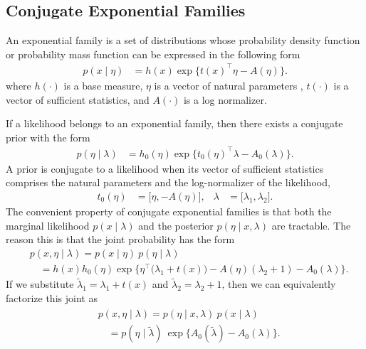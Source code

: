 \documentclass{article}
\begin{document}
\subsection{Conjugate Exponential Families}
An exponential family is a set of distributions whose probability density function or probability mass function can be expressed in the following form
\begin{align}
\label{eq:cebm-likelihood}
    p(x \mid \eta) 
    &= 
    h(x) \exp \big\{ 
        t(x)^\top \eta   
        - A(\eta) \big\}.
\end{align}
where $h(\cdot)$ is a base measure, $\eta$ is a vector of natural parameters , $t(\cdot)$ is a vector of sufficient statistics, and $A(\cdot)$ is a log normalizer.

If a likelihood belongs to an exponential family, then there exists a conjugate prior with the form
\begin{align*}
    p(\eta \mid \lambda) 
    &= 
    h_0(\eta) \exp \big\{ 
    t_0(\eta)^\top \lambda
    - A_0(\lambda) \big\}.
\end{align*}   
A prior is conjugate to a likelihood when its vector of sufficient statistics comprises the natural parameters and the log-normalizer of the likelihood,
\begin{align*}
    t_0(\eta) &= \big[ \eta, - A(\eta) \big], 
    &
    \lambda &= \big[ \lambda_1, \lambda_2 \big].
\end{align*}
The convenient property of conjugate exponential families is that both the marginal likelihood $p(x \mid \lambda)$ and the posterior $p(\eta \mid x, \lambda)$ are tractable. The reason this is that the joint probability has the form
\begin{align*}
    & p(x, \eta \mid \lambda) = p(x \mid \eta) \: p(\eta \mid \lambda)\\
    & \quad
    =h(x)h_0(\eta)\exp \big\{ 
      \eta^\top \! \big(\lambda_1 \!+\! t(x)\big) 
      -
      A(\eta) (\lambda_2 \!+\! 1) 
      -
      A_0(\lambda)
    \big\}.
\end{align*}
If we substitute $\tilde{\lambda}_1 = \lambda_1 + t(x)$ and $\tilde{\lambda}_2 = \lambda_2 + 1$, then we can equivalently factorize this joint as
\begin{align}
    \label{eq:cef-joint}
    \begin{split}
    & p(x, \eta \mid \lambda) = p(\eta \mid x, \lambda) \: p(x \mid \lambda) \\
    & \quad = p(\eta \mid \tilde{\lambda}) \: \exp\big\{ A_0(\tilde{\lambda}) - A_0(\lambda) \big\}.
    \end{split}
\end{align}
\end{document}
